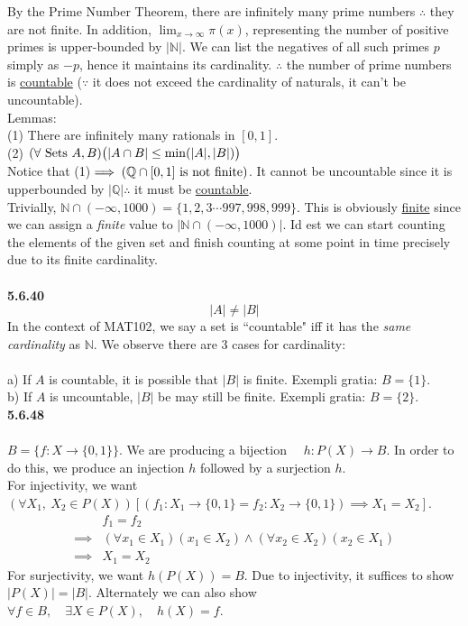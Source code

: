 \documentclass[12pt]{article}
\begin{document}
By the Prime Number Theorem, there are infinitely many prime numbers $\therefore$ they are not finite. In addition, $\lim_{x\to \infty} \pi(x)$, representing the number of positive primes is upper-bounded by $|\mathbb{N}|$. We can list the negatives of all such primes $p$ simply as $-p$, hence it maintains its cardinality. $\therefore$ the number of prime numbers is \underline{countable} ($\because$ it does not exceed the cardinality of naturals, it can't be uncountable).\\

Lemmas:\\ 
(1) There are infinitely many rationals in $[0,1]$.\\ 
(2) $(\forall\ \textnormal{Sets}\ A, B)\big(|A \cap B| \leq \min(|A|, |B|)\big)$\\
Notice that (1)$\implies \left(\mathbb{Q} \cap [0,1]\ \textnormal{is not finite}\right)$. It cannot be uncountable since it is upperbounded by $|\mathbb{Q}| \therefore$ it must be \underline{countable}.\\

Trivially, $\mathbb{N} \cap (-\infty, 1000) = \{1, 2, 3 \cdots 997, 998, 999\}$. This is obviously \underline{finite} since we can assign a \emph{finite} value to $|\mathbb{N} \cap (-\infty, 1000)|$. Id est we can start counting the elements of the given set and finish counting at some point in time precisely due to its finite cardinality.\\\\
\textbf{5.6.40}
$$|A|\not= |B|$$
In the context of MAT102, we say a set is ``countable" iff it has the \emph{same cardinality} as $\mathbb{N}$. We observe there are $3$ cases for cardinality:\\\\
a) If $A$ is countable, it is possible that $|B|$ is finite. Exempli gratia: $B = \{1\}$.\\
b) If $A$ is uncountable, $|B|$ be may still be finite. Exempli gratia: $B = \{2\}$.\\
\textbf{5.6.48}\\\\
$B=\{f:X\to \{0,1\}\}$. We are producing a bijection $\quad h: P(X) \to B$. In order to do this, we produce an injection $h$ followed by a surjection $h$.\\

For injectivity, we want $\left(\forall X_1,\ X_2 \in P(X)\right)[(f_1:X_1 \to \{0,1\} = f_2:X_2 \to \{0,1\}) \implies X_1=X_2]$.
\begin{align*}
&f_1=f_2\\
\implies&(\forall x_1 \in X_1)(x_1 \in X_2) \land (\forall x_2 \in X_2)(x_2 \in X_1)\\
\implies& X_1 = X_2
\end{align*}
For surjectivity, we want $h(P(X))=B$. Due to injectivity, it suffices to show $|P(X)| = |B|$. Alternately we can also show $\forall f \in B, \quad \exists X \in P(X), \quad h(X)=f$.\\
\end{document}

